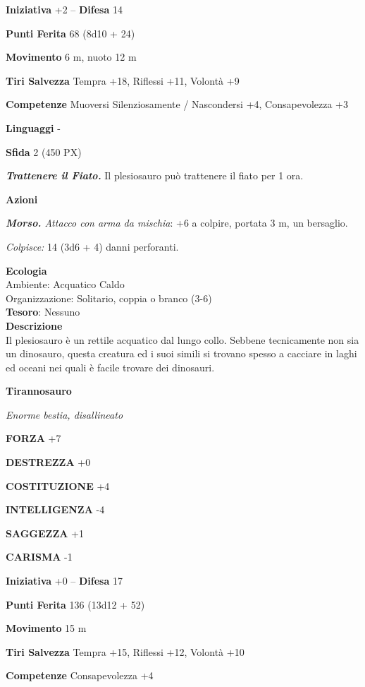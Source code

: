 \begin{multicols}{2}
	\textbf{Iniziativa} +2 -- \textbf{Difesa} 14

	\textbf{Punti Ferita} 68 (8d10 + 24)

	\textbf{Movimento} 6 m, nuoto 12 m

	\textbf{Tiri Salvezza} Tempra +18, Riflessi +11, Volontà +9

	\textbf{Competenze} Muoversi Silenziosamente / Nascondersi +4, Consapevolezza +3

	\textbf{Linguaggi} -

	\textbf{Sfida} 2 (450 PX)

	\textit{\textbf{Trattenere il Fiato.}} Il plesiosauro può trattenere il fiato per 1 ora.

	\textbf{Azioni}

	\textit{\textbf{Morso.} Attacco con arma da mischia}: +6 a colpire, portata 3 m, un bersaglio.

	\textit{Colpisce:} 14 (3d6 + 4) danni perforanti.

	\textbf{Ecologia}\\
	Ambiente: Acquatico Caldo\\
	Organizzazione: Solitario, coppia o branco (3-6)\\
	\textbf{Tesoro}: Nessuno\\
	\textbf{Descrizione}\\
	Il plesiosauro è un rettile acquatico dal lungo collo. Sebbene tecnicamente non sia un dinosauro, questa creatura ed i suoi simili si trovano spesso a cacciare in laghi ed oceani nei quali è facile trovare dei dinosauri.


	\medskip{}\textbf{Tirannosauro}

	\textit{Enorme bestia, disallineato}

	\textbf{FORZA} +7

	\textbf{DESTREZZA} +0

	\textbf{COSTITUZIONE} +4

	\textbf{INTELLIGENZA} -4

	\textbf{SAGGEZZA} +1

	\textbf{CARISMA} -1

	\textbf{Iniziativa} +0 -- \textbf{Difesa} 17

	\textbf{Punti Ferita} 136 (13d12 + 52)

	\textbf{Movimento} 15 m

	\textbf{Tiri Salvezza} Tempra +15, Riflessi +12, Volontà +10

	\textbf{Competenze} Consapevolezza +4


\end{multicols}
